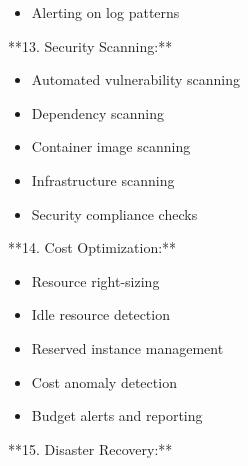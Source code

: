 \documentclass[11pt,a4paper]{article}
\begin{document}
\begin{itemize}
\item Alerting on log patterns
\end{itemize}

**13. Security Scanning:**

\begin{itemize}
\item Automated vulnerability scanning
\end{itemize}

\begin{itemize}
\item Dependency scanning
\end{itemize}

\begin{itemize}
\item Container image scanning
\end{itemize}

\begin{itemize}
\item Infrastructure scanning
\end{itemize}

\begin{itemize}
\item Security compliance checks
\end{itemize}

**14. Cost Optimization:**

\begin{itemize}
\item Resource right-sizing
\end{itemize}

\begin{itemize}
\item Idle resource detection
\end{itemize}

\begin{itemize}
\item Reserved instance management
\end{itemize}

\begin{itemize}
\item Cost anomaly detection
\end{itemize}

\begin{itemize}
\item Budget alerts and reporting
\end{itemize}

**15. Disaster Recovery:**
\end{document}
